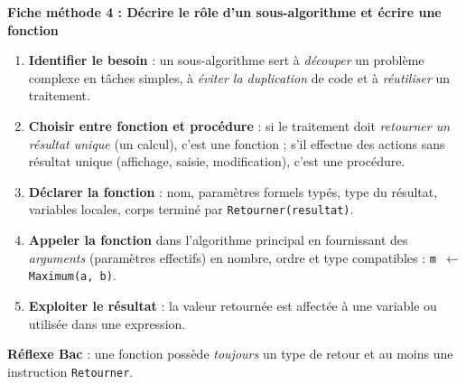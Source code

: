 \documentclass[11pt]{article}
\newcommand{\cle}[1]{{\popxbold\color{popdark}#1}}
\begin{document}
\textbf{Fiche méthode 4 : Décrire le rôle d'un sous-algorithme et écrire une fonction}\par
\begin{methode}
\begin{enumerate}
\item \textbf{Identifier le besoin} : un sous-algorithme sert à \emph{découper} un problème complexe en tâches simples, à \emph{éviter la duplication} de code et à \emph{réutiliser} un traitement.
\item \textbf{Choisir entre fonction et procédure} : si le traitement doit \emph{retourner un résultat unique} (un calcul), c'est une \cle{fonction} ; s'il effectue des actions sans résultat unique (affichage, saisie, modification), c'est une \cle{procédure}.
\item \textbf{Déclarer la fonction} : nom, paramètres formels typés, type du résultat, variables locales, corps terminé par \texttt{Retourner(resultat)}.
\item \textbf{Appeler la fonction} dans l'algorithme principal en fournissant des \emph{arguments} (paramètres effectifs) en nombre, ordre et type compatibles : \texttt{m $\leftarrow$ Maximum(a, b)}.
\item \textbf{Exploiter le résultat} : la valeur retournée est affectée à une variable ou utilisée dans une expression.
\end{enumerate}
\textbf{Réflexe Bac} : une fonction possède \emph{toujours} un type de retour et au moins une instruction \texttt{Retourner}.
\end{methode}
\end{document}
